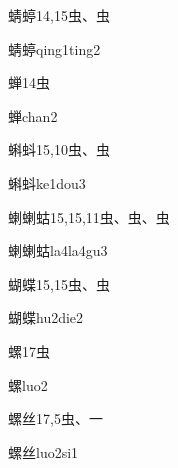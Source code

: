 \begin{entry}{蜻蝏}{14,15}{⾍、⾍}
  \begin{phonetics}{蜻蝏}{qing1ting2}
  \end{phonetics}
\end{entry}

\begin{entry}{蝉}{14}{⾍}
  \begin{phonetics}{蝉}{chan2}
  \end{phonetics}
\end{entry}

\begin{entry}{蝌蚪}{15,10}{⾍、⾍}
  \begin{phonetics}{蝌蚪}{ke1dou3}
  \end{phonetics}
\end{entry}

\begin{entry}{蝲蝲蛄}{15,15,11}{⾍、⾍、⾍}
  \begin{phonetics}{蝲蝲蛄}{la4la4gu3}
  \end{phonetics}
\end{entry}

\begin{entry}{蝴蝶}{15,15}{⾍、⾍}
  \begin{phonetics}{蝴蝶}{hu2die2}
  \end{phonetics}
\end{entry}

\begin{entry}{螺}{17}{⾍}
  \begin{phonetics}{螺}{luo2}
  \end{phonetics}
\end{entry}

\begin{entry}{螺丝}{17,5}{⾍、⼀}
  \begin{phonetics}{螺丝}{luo2si1}
  \end{phonetics}
\end{entry}



